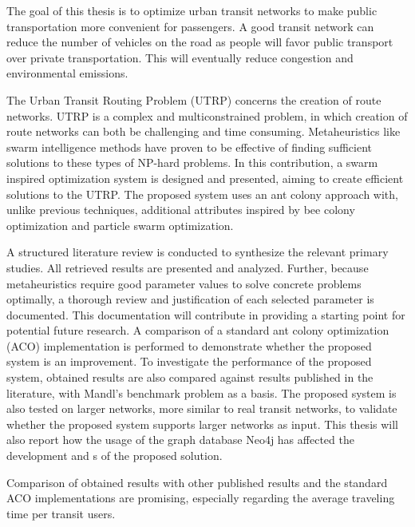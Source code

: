 

The goal of this thesis is to optimize urban transit networks to make public transportation more convenient for passengers. A good transit network can reduce the number of vehicles on the road as people will favor public transport over private transportation. This will eventually reduce congestion and environmental emissions.

The Urban Transit Routing Problem (UTRP) concerns the creation of route networks. UTRP is a complex and multiconstrained problem, in which creation of route networks can both be challenging and time consuming. Metaheuristics like swarm intelligence methods have proven to be effective of finding sufficient solutions to these types of NP-hard problems. In this contribution, a swarm inspired optimization system is designed and presented, aiming to create efficient solutions to the UTRP. The proposed system uses an ant colony approach with, unlike previous techniques, additional attributes inspired by bee colony optimization and particle swarm optimization. 

A structured literature review is conducted to synthesize the relevant primary studies. All retrieved results are presented and analyzed. Further, because metaheuristics require good parameter values to solve concrete problems optimally, a thorough review and justification of each selected parameter is documented. This documentation will contribute in providing a starting point for potential future research. A comparison of a standard ant colony optimization (ACO) implementation is performed to demonstrate whether the proposed system is an improvement. To investigate the performance of the proposed system, obtained results are also compared against results published in the literature, with Mandl's benchmark problem as a basis.  The proposed system is also tested on larger networks, more similar to real transit networks, to validate whether the proposed system supports larger networks as input. This thesis will also report how the usage of the graph database Neo4j has affected the development and s of the proposed solution.  

Comparison of obtained results with other published results and the standard ACO implementations are promising, especially regarding the average traveling time per transit users. 



